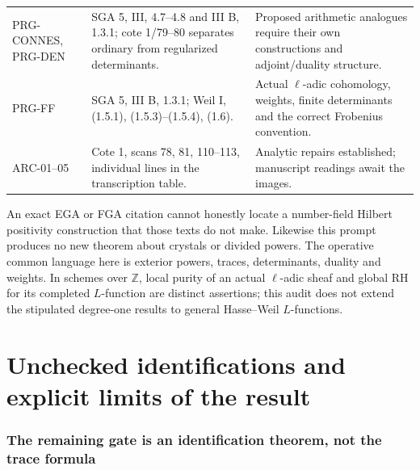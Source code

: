 \documentclass[11pt,a4paper]{article}
\newcommand{\Z}{\mathbb Z}
\begin{document}
\begin{longtable}{>{\raggedright\arraybackslash}p{}>{\raggedright\arraybackslash}p{}>{\raggedright\arraybackslash}p{}}
PRG-CONNES, PRG-DEN & SGA 5, III, 4.7--4.8 and III B, 1.3.1; cote 1/79--80 separates ordinary from regularized determinants. & Proposed arithmetic analogues require their own constructions and adjoint/duality structure.\\
PRG-FF & SGA 5, III B, 1.3.1; Weil I, (1.5.1), (1.5.3)--(1.5.4), (1.6). & Actual $\ell$-adic cohomology, weights, finite determinants and the correct Frobenius convention.\\
ARC-01--05 & Cote 1, scans 78, 81, 110--113, individual lines in the transcription table. & Analytic repairs established; manuscript readings await the images.\\\bottomrule
\end{longtable}
An exact EGA or FGA citation cannot honestly locate a number-field Hilbert positivity construction that those texts do not make. Likewise this prompt produces no new theorem about crystals or divided powers. The operative common language here is exterior powers, traces, determinants, duality and weights. In schemes over $\Z$, local purity of an actual $\ell$-adic sheaf and global RH for its completed $L$-function are distinct assertions; this audit does not extend the stipulated degree-one results to general Hasse--Weil $L$-functions.

\part{Unchecked identifications and explicit limits of the result}
\section{The remaining gate is an identification theorem, not the trace formula}
\end{document}
